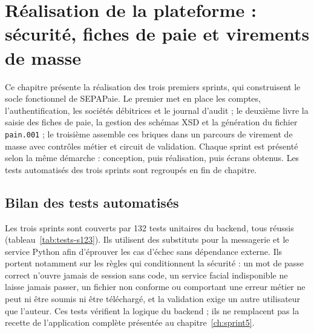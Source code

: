 \chapter{Réalisation de la plateforme : sécurité, fiches de paie et virements de masse}
\label{ch:realisation}

Ce chapitre présente la réalisation des trois premiers sprints, qui construisent le socle fonctionnel de SEPAPaie. Le premier met en place les comptes, l'authentification, les sociétés débitrices et le journal d'audit ; le deuxième livre la saisie des fiches de paie, la gestion des schémas XSD et la génération du fichier \texttt{pain.001} ; le troisième assemble ces briques dans un parcours de virement de masse avec contrôles métier et circuit de validation. Chaque sprint est présenté selon la même démarche : conception, puis réalisation, puis écrans obtenus. Les tests automatisés des trois sprints sont regroupés en fin de chapitre.





\section{Bilan des tests automatisés}

Les trois sprints sont couverts par 132 tests unitaires du backend, tous réussis (tableau~\ref{tab:tests-s123}). Ils utilisent des substituts pour la messagerie et le service Python afin d'éprouver les cas d'échec sans dépendance externe. Ils portent notamment sur les règles qui conditionnent la sécurité : un mot de passe correct n'ouvre jamais de session sans code, un service facial indisponible ne laisse jamais passer, un fichier non conforme ou comportant une erreur métier ne peut ni être soumis ni être téléchargé, et la validation exige un autre utilisateur que l'auteur. Ces tests vérifient la logique du backend ; ils ne remplacent pas la recette de l'application complète présentée au chapitre~\ref{ch:sprint5}.

